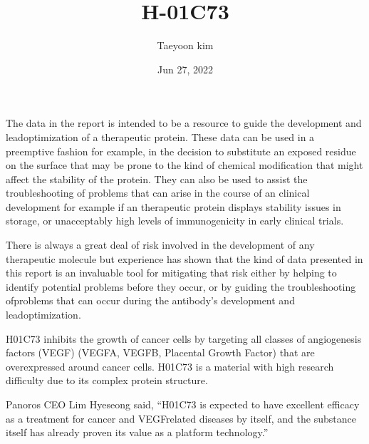 \documentclass[letterpaper,10pt,english]{jupyterBook}
\title{H-01C73}
\date{Jun 27, 2022}
\author{Taeyoon kim}
\begin{document}
\pagestyle{empty}
\sphinxmaketitle
\pagestyle{plain}
\sphinxtableofcontents
\pagestyle{normal}
\label{\detokenize{intro::doc}}


\begin{DUlineblock}{0em}
\item[] 
\end{DUlineblock}

\sphinxAtStartPar
The data in the report is intended to be a resource to guide the development and lead\sphinxhyphen{}optimization of a therapeutic protein. These data can be used in a preemptive fashion \sphinxhyphen{} for example, in the decision to substitute an exposed residue on the surface that may be prone to the kind of chemical modification that might affect the stability of the protein. They can also be used to assist the troubleshooting of problems that can arise in the course of an clinical development \sphinxhyphen{} for example if an therapeutic protein displays stability issues in storage, or unacceptably high levels of immunogenicity in early clinical trials.

\sphinxAtStartPar
There is always a great deal of risk involved in the development of any therapeutic molecule but experience has shown that the kind of data presented in this report is an invaluable tool for mitigating that risk \sphinxhyphen{} either by helping to identify potential problems before they occur, or by guiding the troubleshooting ofproblems that can occur during the antibody’s development and lead\sphinxhyphen{}optimization.

\begin{DUlineblock}{0em}
\item[] 
\end{DUlineblock}

\sphinxAtStartPar
H\sphinxhyphen{}01C73 inhibits the growth of cancer cells by targeting all classes of angiogenesis factors (VEGF) (VEGF\sphinxhyphen{}A, VEGF\sphinxhyphen{}B, Placental Growth Factor) that are overexpressed around cancer cells. H\sphinxhyphen{}01C73 is a material with high research difficulty due to its complex protein structure.

\sphinxAtStartPar
Panoros CEO Lim Hye\sphinxhyphen{}seong said, “H\sphinxhyphen{}01C73 is expected to have excellent efficacy as a treatment for cancer and VEGF\sphinxhyphen{}related diseases by itself, and the substance itself has already proven its value as a platform technology.”
\end{document}
